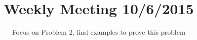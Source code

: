 \documentclass{sig-alternate}
\begin{document}



\title{Weekly Meeting 10/6/2015} %
\subtitle{Focus on Problem 2, find examples to prove this problem}
%
%

%
%
%

\maketitle








%

 


\end{document}
